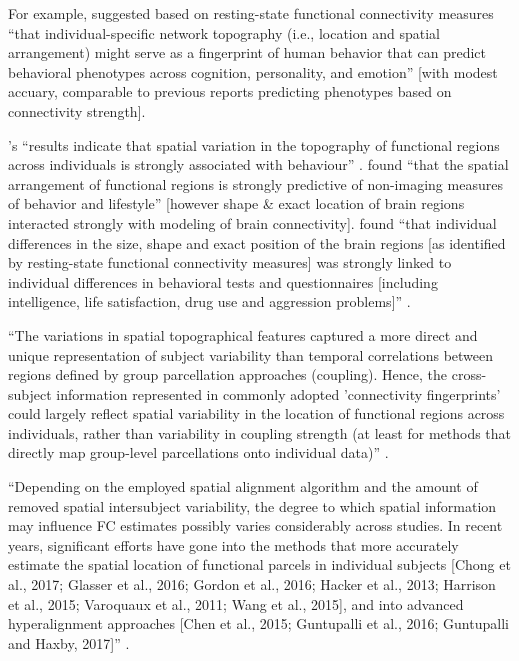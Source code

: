 
%
For example, \citet{kong2019spatial} suggested based on resting-state functional
connectivity measures ``that individual-specific network topography (i.e.,
location and spatial arrangement) might serve as a fingerprint of human behavior
that can predict behavioral phenotypes across cognition, personality, and
emotion'' \citep{kong2019spatial} [with modest accuary, comparable to previous
reports predicting phenotypes based on connectivity strength].

%
\citep{bijsterbosch2018relationship}'s ``results indicate that spatial variation
in the topography of functional regions across individuals is strongly
associated with behaviour'' \citep{bijsterbosch2018relationship}.
%
\citet{bijsterbosch2018relationship} found ``that the spatial arrangement of
functional regions is strongly predictive of non-imaging measures of behavior
and lifestyle'' [however shape \& exact location of brain regions interacted
strongly with  modeling of brain connectivity].
%
\citet{bijsterbosch2018relationship} found ``that individual differences in the
size, shape and exact position of the brain regions [as identified by
resting-state functional connectivity measures] was strongly linked to
individual differences in behavioral tests and questionnaires [including
intelligence, life satisfaction, drug use and aggression problems]''
\citep{bijsterbosch2018relationship}.

%
``The variations in spatial topographical features captured a more direct and
unique representation of subject variability than temporal correlations between
regions defined by group parcellation approaches (coupling).
%
Hence, the cross-subject information represented in commonly adopted
'connectivity fingerprints' could largely reflect spatial variability in the
location of functional regions across individuals, rather than variability in
coupling strength (at least for methods that directly map group-level
parcellations onto individual data)'' \citep{bijsterbosch2018relationship}.

%
``Depending on the employed spatial alignment algorithm and the amount of
removed spatial intersubject variability, the degree to which spatial
information may influence FC estimates possibly varies considerably across
studies.
%
In recent years, significant efforts have gone into the methods that more
accurately estimate the spatial location of functional parcels in individual
subjects [Chong et al., 2017; Glasser et al., 2016; Gordon et al., 2016; Hacker
et al., 2013; Harrison et al., 2015; Varoquaux et al., 2011; Wang et al., 2015],
and into advanced hyperalignment approaches [Chen et al., 2015; Guntupalli et
al., 2016; Guntupalli and Haxby, 2017]'' \citep{bijsterbosch2018relationship}.
